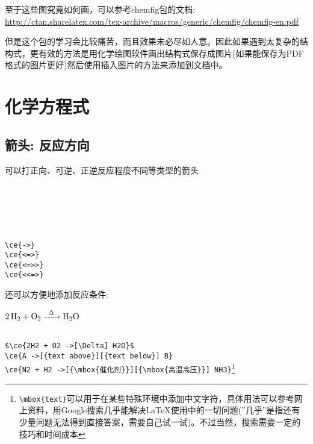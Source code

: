 \documentclass[UTF8, a4paper]{article}
\begin{document}
至于这些图究竟如何画，可以参考chemfig包的文档: \url{http://ctan.sharelatex.com/tex-archive/macros/generic/chemfig/chemfig-en.pdf}

但是这个包的学习会比较痛苦，而且效果未必尽如人意。因此如果遇到太复杂的结构式，更有效的方法是用化学绘图软件画出结构式保存成图片(如果能保存为PDF格式的图片更好)然后使用插入图片的方法来添加到文档中。

\section{化学方程式}
\subsection{箭头: 反应方向}
可以打正向、可逆、正逆反应程度不同等类型的箭头\newline

\begin{minipage}{.3\textwidth} %
	\ \ce{->}\\
	\ce{<=>}\\
	\ce{<=>>}\\
	\ce{<<=>}\\
\end{minipage} %
\begin{minipage}{.7\textwidth} %
	\verb|\ce{->}|\\
	\verb|\ce{<=>}|\\
	\verb|\ce{<=>>}|\\
	\verb|\ce{<<=>}|\\
\end{minipage}

还可以方便地添加反应条件:

\begin{minipage}{.3\textwidth} %
	$\ce{2H2 + O2 ->[\Delta] H2O}$\\
	\\
\end{minipage} %
\begin{minipage}{.7\textwidth} %
	\verb|$\ce{2H2 + O2 ->[\Delta] H2O}$|\\
	\verb|\ce{A ->[{text above}][{text below}] B}|\\
	\verb|\ce{N2 + H2 ->[{\mbox{催化剂}}][{\mbox{高温高压}}] NH3}|\footnote{ {\verb|\mbox{text}|}可以用于在某些特殊环境中添加中文字符，具体用法可以参考网上资料，用Google搜索几乎能解决\LaTeX 使用中的一切问题(''几乎''是指还有少量问题无法得到直接答案，需要自己试一试)。不过当然，搜索需要一定的技巧和时间成本}
	
\end{minipage}
\end{document}
